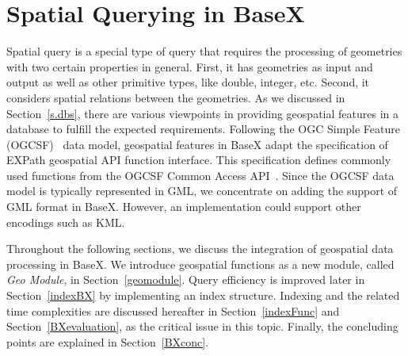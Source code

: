 \documentclass[a4paper,12pt]{article}
\begin{document}
\section{Spatial Querying in BaseX}
\label{s.basex}
Spatial query is a special type of query that requires the processing of geometries with two certain properties in general. First, it has geometries as input and output as well as other primitive types, like double, integer, etc. Second, it considers spatial relations between the geometries.
As we discussed in Section~\ref{s.dbs}, there are various viewpoints in providing geospatial features in a database to fulfill the expected requirements. Following the OGC Simple Feature (OGCSF)~\cite{springergeo} data model, geospatial features in BaseX adapt the specification of EXPath geospatial API function interface. This specification defines commonly used functions from the OGCSF Common Access API~\cite{simpleFeature}. Since the OGCSF data model is typically represented in GML, we concentrate on adding the support of GML format in BaseX. However, an implementation could support other encodings such as KML. 

Throughout the following sections, we discuss the integration of geospatial data processing in BaseX. We introduce geospatial functions as a new module, called \textit{Geo Module}, in Section~\ref{geomodule}. Query efficiency is improved later in Section~\ref{indexBX} by implementing an index structure. Indexing and the related time complexities are discussed hereafter in Section~\ref{indexFunc} and Section~\ref{BXevaluation}, as the critical issue in this topic. Finally, the concluding points are explained in Section~\ref{BXconc}.
\end{document}

